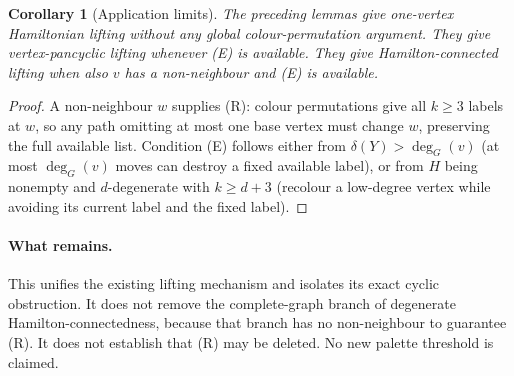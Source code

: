 \documentclass[11pt]{article}
\newtheorem{corollary}[lemma]{Corollary}
\begin{document}
\begin{corollary}[Application limits]
The preceding lemmas give one-vertex Hamiltonian lifting without any
global colour-permutation argument. They give vertex-pancyclic lifting
whenever (E) is available. They give Hamilton-connected lifting when
also $v$ has a non-neighbour and (E) is available.
\end{corollary}
\begin{proof}
A non-neighbour $w$ supplies (R): colour permutations give all $k\ge3$
labels at $w$, so any path omitting at most one base vertex must change
$w$, preserving the full available list. Condition (E) follows either
from $\delta(Y)>\deg_G(v)$ (at most $\deg_G(v)$ moves can destroy a
fixed available label), or from $H$ being nonempty and $d$-degenerate
with $k\ge d+3$ (recolour a low-degree vertex while avoiding its current
label and the fixed label).
\end{proof}

\paragraph{What remains.}
This unifies the existing lifting mechanism and isolates its exact
cyclic obstruction. It does not remove the complete-graph branch of
degenerate Hamilton-connectedness, because that branch has no
non-neighbour to guarantee (R). It does not establish that (R) may be
deleted. No new palette threshold is claimed.
\end{document}
